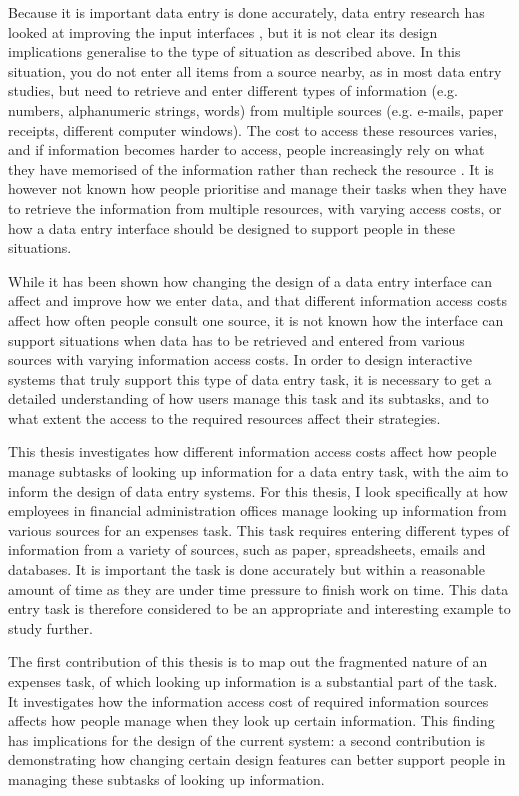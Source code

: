 \documentclass[11pt,oneside]{report}
\begin{document}
Because it is important data entry is done accurately, data entry research has looked at improving the input interfaces \citep[e.g.][]{Oladimeji2013, Vertanen2015, Wiseman2013a}, but it is not clear its design implications generalise to the type of situation as described above. In this situation, you do not enter all items from a source nearby, as in most data entry studies, but need to retrieve and enter different types of information (e.g. numbers, alphanumeric strings, words) from multiple sources (e.g. e-mails, paper receipts, different computer windows). The cost to access these resources varies, and if information becomes harder to access, people increasingly rely on what they have memorised of the information rather than recheck the resource \citep{Gray2006}. It is however not known how people prioritise and manage their tasks when they have to retrieve the information from multiple resources, with varying access costs, or how a data entry interface should be designed to support people in these situations. 

While it has been shown how changing the design of a data entry interface can affect and improve how we enter data, and that different information access costs affect how often people consult one source, it is not known how the interface can support situations when data has to be retrieved and entered from various sources with varying information access costs. In order to design interactive systems that truly support this type of data entry task, it is necessary to get a detailed understanding of how users manage this task and its subtasks, and to what extent the access to the required resources affect their strategies.

This thesis investigates how different information access costs affect how people manage subtasks of looking up information for a data entry task, with the aim to inform the design of data entry systems. For this thesis, I look specifically at how employees in financial administration offices manage looking up information from various sources for an expenses task. This task requires entering different types of information from a variety of sources, such as paper, spreadsheets, emails and databases. It is important the task is done accurately but within a reasonable amount of time as they are under time pressure to finish work on time. This data entry task is therefore considered to be an appropriate and interesting example to study further. 

The first contribution of this thesis is to map out the fragmented nature of an expenses task, of which looking up information is a substantial part of the task. It investigates how the information access cost of required information sources affects how people manage when they look up certain information. This finding has implications for the design of the current system: a second contribution is demonstrating how changing certain design features can better support people in managing these subtasks of looking up information.
\end{document}
